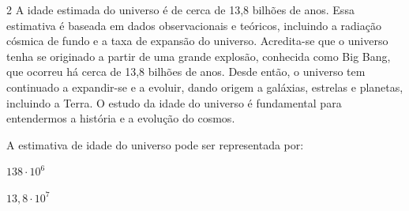\begin{escolha}
\begin{boxmedio}
\begin{boxmedio}
{\begin{boxpeq}
\begin{boxpeq}
{\begin{boxpeq}
\begin{boxmedio}
\begin{boxmedio}
\begin{boxpeq}
\begin{boxmedio}
\begin{boxpeq}
\begin{boxpeq}
\begin{boxpeq}
\begin{boxpeq}
\begin{boxmedio}
{\begin{boxmedio}
\begin{boxmedio}
\begin{boxpeq}
\begin{boxmedio}
\begin{boxpeq}
\begin{boxpeq}
\begin{boxpeq}
\begin{escolha}
{\begin{boxmedio}
\begin{boxpeq}
\begin{boxpeq}
\begin{boxpeq}
\begin{boxpeq}
\begin{boxpeq}
\begin{boxmedio}
\begin{boxpeq}
\begin{boxpeq}
\begin{boxpeq}
{\begin{boxpeq}
\begin{boxmedio}
\begin{boxpeq}
\begin{boxpeq}
\begin{boxpeq}
{\begin{boxpeq}
\begin{boxmedio}
{\begin{boxpeq}
\begin{boxpeq}
\begin{boxmedio}
\begin{boxmedio}
\begin{boxpeq}
\begin{boxpeq}
{\begin{boxpeq}
\begin{boxpeq}
\begin{boxpeq}
\begin{boxpeq}
\begin{boxpeq}
\begin{escolha}
\begin{escolha}
{\begin{boxmedio}
\begin{boxpeq}
\begin{q°}
\begin{boxmedio}
\begin{boxpeq}
\begin{boxpeq}
\begin{boxmedio}
\begin{boxmedio}
\begin{boxmedio}
\begin{boxmedio}

\num{2} A idade estimada do universo é de cerca de 13,8 bilhões de anos. Essa
estimativa é baseada em dados observacionais e teóricos, incluindo a
radiação cósmica de fundo e a taxa de expansão do universo.
Acredita-se que o universo tenha se originado a partir de uma grande
explosão, conhecida como Big Bang, que ocorreu há cerca de 13,8
bilhões de anos. Desde então, o universo tem continuado a expandir-se
e a evoluir, dando origem a galáxias, estrelas e planetas, incluindo a
Terra. O estudo da idade do universo é fundamental para entendermos a
história e a evolução do cosmos.

A estimativa de idade do universo pode ser representada por:

\begin{escolha}

\item $138 \cdot 10^{6}$

\item $13,8 \cdot 10^{7}$


\end{escolha}
\end{boxmedio}
\end{boxmedio}
\end{boxmedio}
\end{boxmedio}
\end{boxpeq}
\end{boxpeq}
\end{boxmedio}
\end{q°}
\end{boxpeq}
\end{boxmedio}}
\end{escolha}
\end{escolha}
\end{boxpeq}
\end{boxpeq}
\end{boxpeq}
\end{boxpeq}
\end{boxpeq}}
\end{boxpeq}
\end{boxpeq}
\end{boxmedio}
\end{boxmedio}
\end{boxpeq}
\end{boxpeq}}
\end{boxmedio}
\end{boxpeq}}
\end{boxpeq}
\end{boxpeq}
\end{boxpeq}
\end{boxmedio}
\end{boxpeq}}
\end{boxpeq}
\end{boxpeq}
\end{boxpeq}
\end{boxmedio}
\end{boxpeq}
\end{boxpeq}
\end{boxpeq}
\end{boxpeq}
\end{boxpeq}
\end{boxmedio}}
\end{escolha}
\end{boxpeq}
\end{boxpeq}
\end{boxpeq}
\end{boxmedio}
\end{boxpeq}
\end{boxmedio}
\end{boxmedio}}
\end{boxmedio}
\end{boxpeq}
\end{boxpeq}
\end{boxpeq}
\end{boxpeq}
\end{boxmedio}
\end{boxpeq}
\end{boxmedio}
\end{boxmedio}
\end{boxpeq}}
\end{boxpeq}
\end{boxpeq}}
\end{boxmedio}
\end{boxmedio}
\end{escolha}
